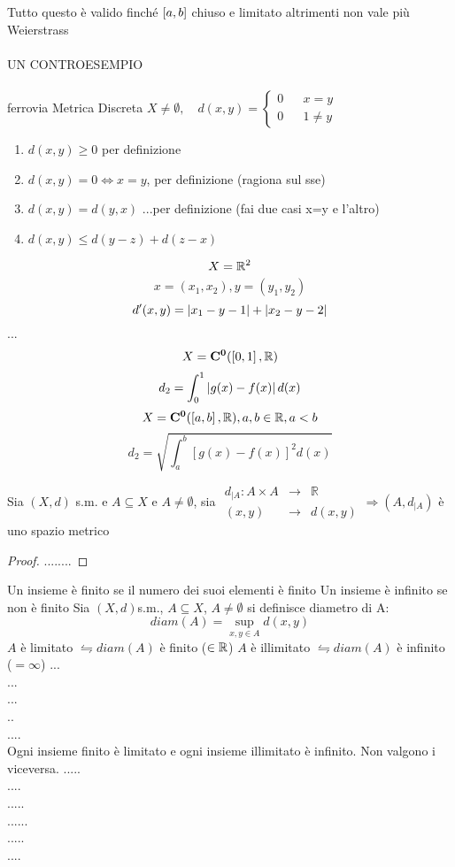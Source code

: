 \observation 
Tutto questo è valido finché $\left[a,b\right]$ chiuso e limitato altrimenti non vale più Weierstrass \\
\\
UN CONTROESEMPIO\\
\\
\example
ferrovia
\example
Metrica Discreta
$X\ne \emptyset,\quad d(x,y)= \left\{\begin{matrix}0&&x=y\\0&&1\ne y\end{matrix}\right.$
	\begin{enumerate}
		\item $d(x,y)\ge 0$ per definizione
		\item $d(x,y)=0\iff x=y$, per definizione (ragiona sul sse) 
		\item $d(x,y)=d(y,x)$ ...per definizione (fai due casi x=y e l'altro)
		\item $d(x,y)\le d(y-z)+d(z-x)$ 
	\end{enumerate}
\example
$$X=\mathbb{R}^{2}$$
$$x=(x_1,x_2), y=(y_1,y_2)$$
$$d'(x,y)=\left|x_1-y-1\right|+\left|x_2-y-2\right|$$
...\\

\example
\example
$$X=\mathbf{C^{0}}(\left[0,1\right],\mathbb{R})$$
$$d_2=\int_0^1\left|g(x)-f(x)\right|d(x)$$
\example
$$X=\mathbf{C^{0}}(\left[a,b\right],\mathbb{R}), a,b\in\mathbb{R}, a<b$$
$$d_2=\sqrt{\int_a^b\left[g(x)-f(x)\right]^2d(x)}$$

\proposition
Sia $(X,d)$ s.m. e $A\subseteq X$ e $A\ne \emptyset$, sia $\begin{array}{rcl} d_{|A} : A\times A & \to & \mathbb{R} \\ (x,y) & \to & d(x,y) \end{array} \Rightarrow (A,d_{|A})$ è uno spazio metrico
\begin{proof}
	........
\end{proof}

Un insieme è finito se il numero dei suoi elementi è finito
Un insieme è infinito se non è finito
Sia $(X,d)$s.m., $A\subseteq X$, $A\ne \emptyset$ si definisce diametro di A: $$diam(A)=\sup\limits_{x,y\in A}d(x,y)$$
$A$ è limitato $\leftrightharpoons diam(A)$ è finito ($\in\mathbb{R}$)
$A$ è illimitato $\leftrightharpoons diam(A)$ è infinito ($=\infty$)
\example
...\\
...\\
...\\
..\\
....\\
\observation
Ogni insieme finito è limitato e ogni insieme illimitato è infinito. Non valgono i viceversa.
\example 
.....\\
....\\
.....\\
......\\
.....\\
....\\

